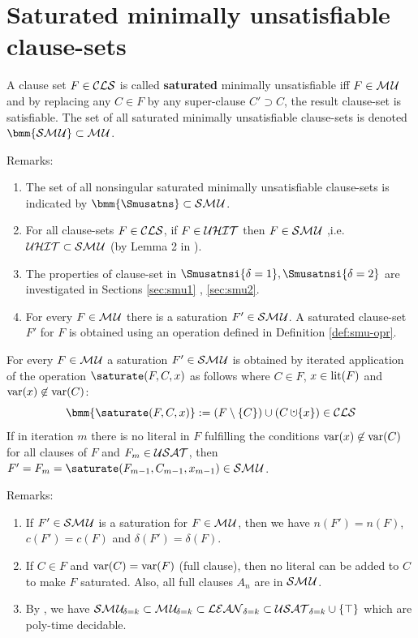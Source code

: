 \documentclass{report}
\begin{document}
\section{Saturated minimally unsatisfiable clause-sets}
\label{sec:smu}

\begin{defi}\label{def:smu}
A clause set $F \in \mathcal{CLS}$ is called \textbf{saturated} minimally unsatisfiable iff $F \in \mathcal{M\hspace{0.8pt}U} $ and by replacing any $C \in F$ by any super-clause $C' \supset C$, the result clause-set is satisfiable. The set of all saturated minimally unsatisfiable clause-sets is denoted $\bmm{\Smusat} \subset \Musat$.
\end{defi}
Remarks:
  \begin{enumerate}
  \item The set of all nonsingular saturated minimally unsatisfiable clause-sets is indicated by $\bmm{\Smusatns} \subset \Smusat$.
  \item For all clause-sets $F \in \mathcal{CLS}$, if $F \in \mathcal{U}\mathcal{HIT}$ then $ F \in \mathcal{S}\mathcal{M\hspace{0.8pt}U}$ ,i.e. $\mathcal{U}\mathcal{HIT} \subset \mathcal{S}\mathcal{M\hspace{0.8pt}U}$ (by Lemma 2 in \cite{KullmannZhao2012ConfluenceJ}). 
  \item The properties of clause-set in $\Smusatnsi{\delta=1}, \Smusatnsi{\delta=2}$ are investigated in Sections \ref{sec:smu1} , \ref{sec:smu2}.
  \item For every $F \in \mathcal{M\hspace{0.8pt}U}$ there is a saturation $F' \in \mathcal{S}\mathcal{M\hspace{0.8pt}U}$. A saturated clause-set  $F'$ for $F$ is obtained using an operation defined in Definition \ref{def:smu-opr}.
  \end{enumerate}

\begin{defi}\label{def:smu-opr}
\cite{KullmannZhao2012ConfluenceJ} For every $F \in \mathcal{M\hspace{0.8pt}U}$ a saturation $F' \in \mathcal{S}\mathcal{M\hspace{0.8pt}U}$ is obtained by iterated application of the operation $\saturate(F,C,x)$ as follows where $C \in F$, $x \in \operatorname{lit}(F)$ and $\operatorname{var}(x) \not \in \operatorname{var}(C)$:
  \begin{displaymath}
    \bmm{\saturate(F,C,x)} := (F \sm \set{C}) \cup (C \addcup \set{x}) \in \Cls
  \end{displaymath}
If in iteration $m$ there is no literal in $F$ fulfilling the conditions $\operatorname{var}(x) \not \in \operatorname{var}(C)$ for all clauses of $F$ and $F_m \in \mathcal{USAT}$, then $F' =F_m=\saturate(F_{m-1},C_{m-1},x_{m-1}) \in \Smusat$. 
\end{defi}
Remarks:
  \begin{enumerate}
  \item If $F' \in \mathcal{S}\mathcal{M\hspace{0.8pt}U}$ is a saturation for $F \in \mathcal{M\hspace{0.8pt}U}$, then we have $n(F')=n(F)$, $c(F')=c(F)$ and $\delta(F')=\delta(F)$.
  \item If $C \in F$ and $\operatorname{var}(C) = \operatorname{var}(F)$ (full clause), then no literal can be added to $C$ to make $F$ saturated. Also, all full clauses $A_n$ are in $\mathcal{S}\mathcal{M\hspace{0.8pt}U}$.
  \item By \cite{Ku99dK}, we have $ \mathcal{S}\mathcal{M\hspace{0.8pt}U}_{\!\delta=k} \subset \mathcal{M\hspace{0.8pt}U}_{\!\delta=k} \subset \mathcal{LEAN}_{\delta=k} \subset \mathcal{USAT}_{\delta=k} \cup \{ \top \} $ which are poly-time decidable.
  \end{enumerate} 
  
\end{document}
